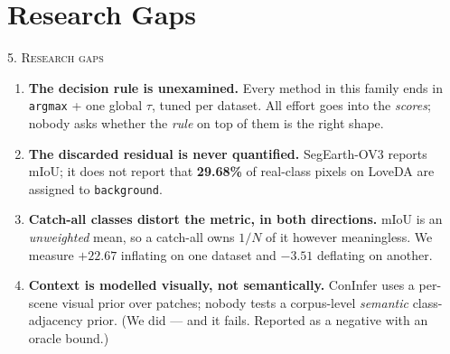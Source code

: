 \documentclass[aspectratio=169]{beamer}
\newcommand{\best}[1]{\textcolor{acc}{\textbf{#1}}}
\newcommand{\bad}[1]{\textcolor{warn}{#1}}
\newcommand{\bg}{\texttt{background}}
\begin{document}
\section{Research Gaps}
\begin{frame}{\textsc{5. Research gaps}}
\begin{enumerate}
  \item \best{The decision rule is unexamined.} Every method in this family ends
        in \texttt{argmax} + one global $\tau$, tuned per dataset. All effort
        goes into the \emph{scores}; nobody asks whether the \emph{rule} on top
        of them is the right shape.
  \vspace{0.4em}
  \item \best{The discarded residual is never quantified.} SegEarth-OV3 reports
        mIoU; it does not report that \best{29.68\%} of real-class pixels on
        LoveDA are assigned to \bg{}.
  \vspace{0.4em}
  \item \best{Catch-all classes distort the metric, in both directions.} mIoU is
        an \emph{unweighted} mean, so a catch-all owns $1/N$ of it however
        meaningless. We measure $+22.67$ inflating on one dataset and $-3.51$
        deflating on another.
  \vspace{0.4em}
  \item \best{Context is modelled visually, not semantically.} ConInfer uses a
        per-scene visual prior over patches; nobody tests a corpus-level
        \emph{semantic} class-adjacency prior. \bad{(We did --- and it fails.
        Reported as a negative with an oracle bound.)}
\end{enumerate}
\end{frame}

\end{document}
